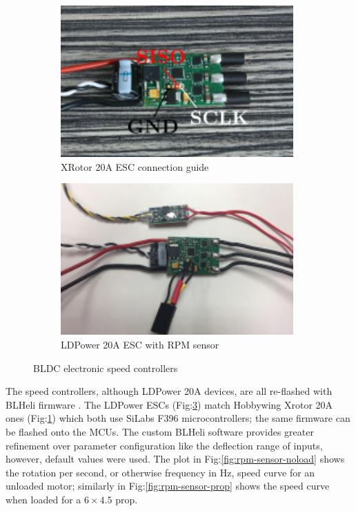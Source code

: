 \begin{figure}[hbtp]
\begin{subfigure}{0.5\textwidth}
\centering
\includegraphics[width=0.98\textwidth]{figs/xrotor-20A}
\caption{XRotor 20A ESC connection guide\cite{xrotor}}
\label{fig:xrotor-20A}
\end{subfigure}
\begin{subfigure}{0.5\textwidth}
\centering
\includegraphics[width=0.98\textwidth]{figs/ldpower-20A}
\caption{LDPower 20A ESC with RPM sensor}
\label{fig:ldpower-20A}
\end{subfigure}
\caption{BLDC electronic speed controllers}
\vspace{-6pt}
\end{figure}
\par
The speed controllers, although LDPower 20A devices, are all re-flashed with BLHeli firmware \cite{BLHeli}. The LDPower ESCs (Fig:\ref{fig:ldpower-20A}) match Hobbywing Xrotor 20A ones (Fig:\ref{fig:xrotor-20A}) which both use SiLabs F396 microcontrollers; the same firmware can be flashed onto the MCUs. The custom BLHeli software provides greater refinement over parameter configuration like the deflection range of inputs, however, default values were used. The plot in Fig:\ref{fig:rpm-sensor-noload} shows the rotation per second, or otherwise frequency in Hz, speed curve for an unloaded motor; similarly in Fig:\ref{fig:rpm-sensor-prop} shows the speed curve when loaded for a $6\times 4.5$ prop. 
